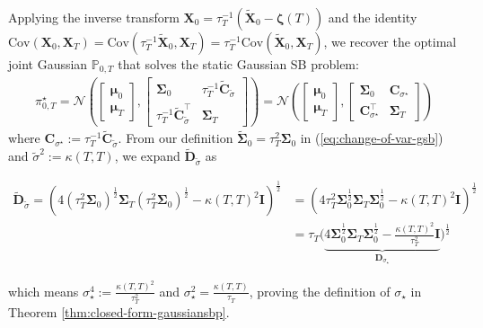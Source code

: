 \documentclass{article}
\begin{document}
Applying the inverse transform $\boldsymbol{X}_0=\tau_T^{-1}(\tilde{\boldsymbol{X}}_0-\boldsymbol{\zeta}(T))$ and the identity $\text{Cov}(\boldsymbol{X}_0, \boldsymbol{X}_T)=\text{Cov}(\tau_T^{-1}\tilde{\boldsymbol{X}}_0, \boldsymbol{X}_T)=\tau_T^{-1}\text{Cov}(\tilde{\boldsymbol{X}}_0, \boldsymbol{X}_T)$, we recover the optimal joint Gaussian $\mathbb{P}_{0,T}$ that solves the static Gaussian SB problem: 
\begin{align}
    \pi_{0,T}^\star=\mathcal{N}\left(\begin{bmatrix}
        \boldsymbol{\mu}_0\\ \boldsymbol{\mu}_T
    \end{bmatrix}, \begin{bmatrix}
        \boldsymbol{\Sigma}_0 & \tau_T^{-1}\tilde{\boldsymbol{C}}_{\tilde{\sigma}}\\
        \tau_T^{-1}\tilde{\boldsymbol{C}}_{\tilde{\sigma}}^\top & \boldsymbol{\Sigma}_T
    \end{bmatrix}\right)=\mathcal{N}\left(\begin{bmatrix}
        \boldsymbol{\mu}_0\\ \boldsymbol{\mu}_T
    \end{bmatrix}, \begin{bmatrix}
        \boldsymbol{\Sigma}_0 & \boldsymbol{C}_{\sigma^\star}\\
       \boldsymbol{C}_{\sigma^\star}^\top & \boldsymbol{\Sigma}_T
    \end{bmatrix}\right)\label{eq:optimal-joint-gaussian}
\end{align}
where $\boldsymbol{C}_{\sigma^\star}:=\tau_T^{-1}\tilde{\boldsymbol{C}}_{\tilde{\sigma}}$. From our definition $\tilde{\boldsymbol{\Sigma}}_0=\tau_T^2\boldsymbol{\Sigma}_0$ in (\ref{eq:change-of-var-gsb}) and $\tilde{\sigma}^2:=\kappa(T,T)$, we expand $\tilde{\boldsymbol{D}}_{\tilde{\sigma}}$ as
\begin{small}
\begin{align}
    \tilde{\boldsymbol{D}}_{\tilde{\sigma}}=\left(4(\tau_T^2\boldsymbol{\Sigma}_0)^{\frac{1}{2}}\boldsymbol{\Sigma}_T(\tau_T^2\boldsymbol{\Sigma}_0)^{\frac{1}{2}}-\kappa(T,T)^2\boldsymbol{I}\right)^{\frac{1}{2}}&=\left(4\tau_T^2\boldsymbol{\Sigma}_0^{\frac{1}{2}}\boldsymbol{\Sigma}_T\boldsymbol{\Sigma}_0^{\frac{1}{2}}-\kappa(T,T)^2\boldsymbol{I}\right)^{\frac{1}{2}}\nonumber\\
    &=\tau_T\bigg(\underbrace{4\boldsymbol{\Sigma}_0^{\frac{1}{2}}\boldsymbol{\Sigma}_T\boldsymbol{\Sigma}_0^{\frac{1}{2}}-\frac{\kappa(T,T)^2}{\tau_T^2}\boldsymbol{I}}_{\boldsymbol{D}_{\sigma_\star}}\bigg)^{\frac{1}{2}}
\end{align}
\end{small}
which means $\sigma_\star^4:=\frac{\kappa(T,T)^2}{\tau_T^2}$ and $\sigma_\star^2=\frac{\kappa(T,T)}{\tau_T}$, proving the definition of $\sigma_\star$ in Theorem \ref{thm:closed-form-gaussiansbp}.
\end{document}
